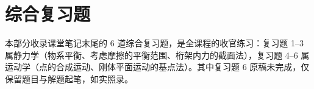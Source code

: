 
\section{综合复习题}

本部分收录课堂笔记末尾的 6 道综合复习题，是全课程的收官练习：复习题 1--3 属静力学（物系平衡、考虑摩擦的平衡范围、桁架内力的截面法），复习题 4--6 属运动学（点的合成运动、刚体平面运动的基点法）。其中复习题 6 原稿未完成，仅保留题目与解题起笔，如实照录。

